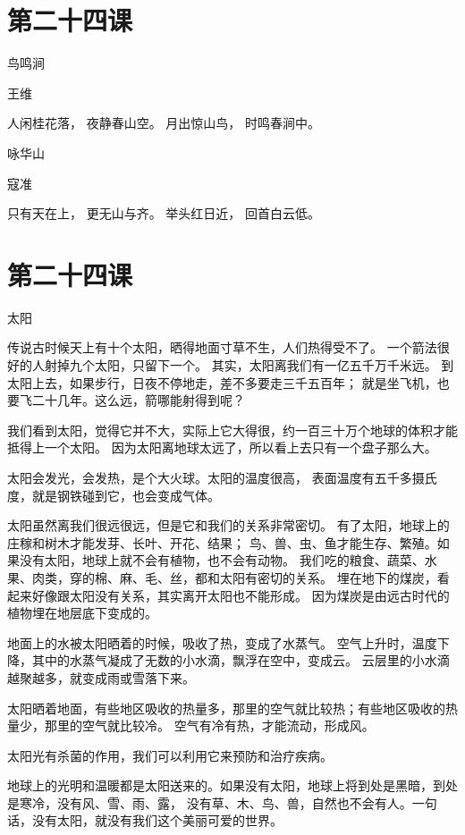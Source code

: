 \documentclass[12pt,UTF8]{ctexbook}
\begin{document}
\section{第二十四课}

鸟鸣涧

王维

人闲桂花落，
夜静春山空。
月出惊山鸟，
时鸣春涧中。

咏华山

寇准

只有天在上，
更无山与齐。
举头红日近，
回首白云低。

\section{第二十四课}

太阳

传说古时候天上有十个太阳，晒得地面寸草不生，人们热得受不了。
一个箭法很好的人射掉九个太阳，只留下一个。
其实，太阳离我们有一亿五千万千米远。
到太阳上去，如果步行，日夜不停地走，差不多要走三千五百年；
就是坐飞机，也要飞二十几年。这么远，箭哪能射得到呢？

我们看到太阳，觉得它并不大，实际上它大得很，约一百三十万个地球的体积才能抵得上一个太阳。
因为太阳离地球太远了，所以看上去只有一个盘子那么大。

太阳会发光，会发热，是个大火球。太阳的温度很高，
表面温度有五千多摄氏度，就是钢铁碰到它，也会变成气体。

太阳虽然离我们很远很远，但是它和我们的关系非常密切。
有了太阳，地球上的庄稼和树木才能发芽、长叶、开花、结果；
鸟、兽、虫、鱼才能生存、繁殖。如果没有太阳，地球上就不会有植物，也不会有动物。
我们吃的粮食、蔬菜、水果、肉类，穿的棉、麻、毛、丝，都和太阳有密切的关系。
埋在地下的煤炭，看起来好像跟太阳没有关系，其实离开太阳也不能形成。
因为煤炭是由远古时代的植物埋在地层底下变成的。

地面上的水被太阳晒着的时候，吸收了热，变成了水蒸气。
空气上升时，温度下降，其中的水蒸气凝成了无数的小水滴，飘浮在空中，变成云。
云层里的小水滴越聚越多，就变成雨或雪落下来。

太阳晒着地面，有些地区吸收的热量多，那里的空气就比较热；有些地区吸收的热量少，那里的空气就比较冷。
空气有冷有热，才能流动，形成风。

太阳光有杀菌的作用，我们可以利用它来预防和治疗疾病。

地球上的光明和温暖都是太阳送来的。如果没有太阳，地球上将到处是黑暗，到处是寒冷，没有风、雪、雨、露，
没有草、木、鸟、兽，自然也不会有人。一句话，没有太阳，就没有我们这个美丽可爱的世界。
\end{document}

